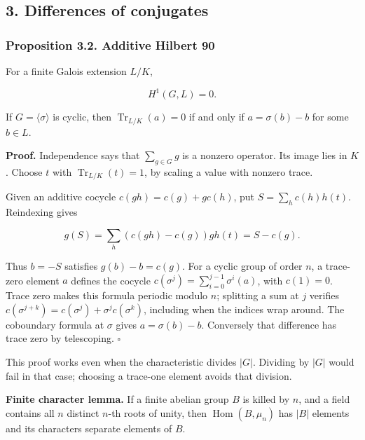 \documentclass[11pt,a4paper]{article}
\begin{document}
\subsection{3. Differences of
conjugates}\label{differences-of-conjugates}

\subsubsection{Proposition 3.2. Additive Hilbert
90}\label{proposition-3.2.-additive-hilbert-90}

For a finite Galois extension \(L/K\),

\[
H^1(G,L)=0.
\]

If \(G=\langle\sigma\rangle\) is cyclic, then
\(\operatorname{Tr}_{L/K}(a)=0\) if and only if \(a=\sigma(b)-b\) for
some \(b\in L\).

\textbf{Proof.} Independence says that \(\sum_{g\in G}g\) is a nonzero
operator. Its image lies in \(K\). Choose \(t\) with
\(\operatorname{Tr}_{L/K}(t)=1\), by scaling a value with nonzero trace.

Given an additive cocycle \(c(gh)=c(g)+g c(h)\), put
\(S=\sum_h c(h)h(t)\). Reindexing gives

\[
g(S)=\sum_h(c(gh)-c(g))gh(t)=S-c(g).
\]

Thus \(b=-S\) satisfies \(g(b)-b=c(g)\). For a cyclic group of order
\(n\), a trace-zero element \(a\) defines the cocycle
\(c(\sigma^j)=\sum_{i=0}^{j-1}\sigma^i(a)\), with \(c(1)=0\). Trace zero
makes this formula periodic modulo \(n\); splitting a sum at \(j\)
verifies \(c(\sigma^{j+k})=c(\sigma^j)+\sigma^j c(\sigma^k)\), including
when the indices wrap around. The coboundary formula at \(\sigma\) gives
\(a=\sigma(b)-b\). Conversely that difference has trace zero by
telescoping. \(\square\)

This proof works even when the characteristic divides \(|G|\). Dividing
by \(|G|\) would fail in that case; choosing a trace-one element avoids
that division.

\textbf{Finite character lemma.} If a finite abelian group \(B\) is
killed by \(n\), and a field contains all \(n\) distinct \(n\)-th roots
of unity, then \(\operatorname{Hom}(B,\mu_n)\) has \(|B|\) elements and
its characters separate elements of \(B\).
\end{document}

